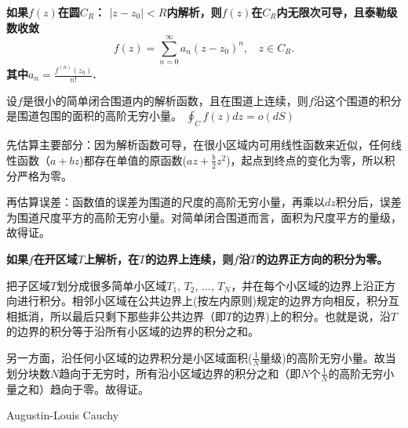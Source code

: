 \documentclass[CJK]{beamer}
\begin{document}
\begin{frame}
  \bch
  {\blue \bf
  如果$f(z)$在圆$C_R$： $|z-z_0|< R$内解析，则$f(z)$在$C_R$内无限次可导，且泰勒级数收敛
  $$f(z) = \sum_{n=0}^\infty a_n(z-z_0)^n, \  \ \ \ z\in C_R.$$
  其中$a_n = \frac{f^{(n)}(z_0)}{n!}$.
  }
  \ech
\end{frame}

\begin{frame}
  \bch
      {\blue 设$f$是很小的简单闭合围道内的解析函数，且在围道上连续，则$f$沿这个围道的积分是围道包围的面积的高阶无穷小量。
        $\oint_C f(z)dz = o(dS)$
        }

  \bitem
  \item{  先估算主要部分：因为解析函数可导，在很小区域内可用线性函数来近似，任何线性函数（$a+bz$)都存在单值的原函数($az+\frac{b}{2}z^2$)，起点到终点的变化为零，所以积分严格为零。}

  \item {再估算误差：函数值的误差为围道的尺度的高阶无穷小量，再乘以$dz$积分后，误差为围道尺度平方的高阶无穷小量。对简单闭合围道而言，面积为尺度平方的量级，故得证。}
  \eitem
  \ech
\end{frame}


\begin{frame}
  \bch
 {\bf \blue 如果$f$在开区域$T$上解析，在$T$的边界上连续，则$f$沿$T$的边界正方向的积分为零。}

 把子区域$T$划分成很多简单小区域$T_1$, $T_2$, $\ldots$, $T_N$，并在每个小区域的边界上沿正方向进行积分。相邻小区域在公共边界上(按左内原则)规定的边界方向相反，积分互相抵消，所以最后只剩下那些非公共边界（即$T$的边界)上的积分。也就是说，沿$T$的边界的积分等于沿所有小区域的边界的积分之和。

   \emini
   另一方面，沿任何小区域的边界积分是小区域面积($\frac{1}{N}$量级)的高阶无穷小量。故当划分块数$N$趋向于无穷时，所有沿小区域边界的积分之和（即$N$个$\frac{1}{N}$的高阶无穷小量之和）趋向于零。故得证。
   \emini
  \ech
\end{frame}

\begin{frame}
  \bch
  \bcenter

  Augustin-Louis Cauchy
  \ecenter
  \ech
\end{frame}
\end{document}
